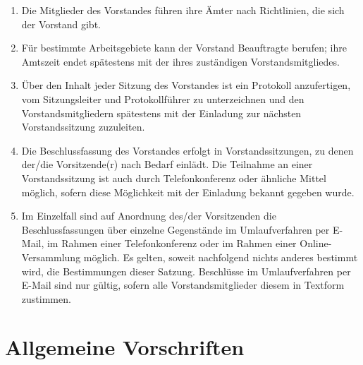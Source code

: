 \documentclass[%
12pt, %
a4paper, %
headsepline, %
parskip, %
headings=normal, %
]{scrreprt}
\begin{document}
\begin{enumerate}
    \item Die Mitglieder des Vorstandes führen ihre Ämter nach Richtlinien, die sich der Vorstand gibt.
    \item Für bestimmte Arbeitsgebiete kann der Vorstand Beauftragte berufen; ihre Amtszeit endet spätestens mit der ihres zuständigen Vorstandsmitgliedes.
    \item Über den Inhalt jeder Sitzung des Vorstandes ist ein Protokoll anzufertigen, vom Sitzungsleiter und Protokollführer zu unterzeichnen und den Vorstandsmitgliedern spätestens mit der Einladung zur nächsten Vorstandssitzung zuzuleiten.
    \item Die Beschlussfassung des Vorstandes erfolgt in Vorstandssitzungen, zu denen der/die Vorsitzende(r) nach Bedarf einlädt. Die Teilnahme an einer Vorstandssitzung ist auch durch Telefonkonferenz oder ähnliche Mittel möglich, sofern diese Möglichkeit mit der Einladung bekannt gegeben wurde.
    \item Im Einzelfall sind auf Anordnung des/der Vorsitzenden die Beschlussfassungen über einzelne Gegenstände im Umlaufverfahren per E-Mail, im Rahmen einer Telefonkonferenz oder im Rahmen einer Online-Versammlung möglich. Es gelten, soweit nachfolgend nichts anderes bestimmt wird, die Bestimmungen dieser Satzung. Beschlüsse im Umlaufverfahren per E-Mail sind nur gültig, sofern alle Vorstandsmitglieder diesem in Textform zustimmen.
\end{enumerate}

\chapter{Allgemeine Vorschriften}
\setcounter{section}{7}
\end{document}
